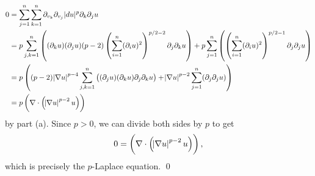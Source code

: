 \documentclass{article}
\newcommand{\D}{\nabla}
\renewcommand{\d}{\partial}
\begin{document}
\begin{enumerate}[(a)]
    \begin{align*}
        0 &= \sum_{j=1}^n\sum_{k=1}^n \d_{v_k}\d_{v_j}|du|^p \d_k\d_j u \\
        &= p \sum_{j,k =1}^n \del{ (\d_k u)(\d_j u)(p-2)\del{\sum_{i=1}^n (\d_i u)^2}^{p/2-2}\d_j\d_k u} + p\sum_{j=1}^n\del{\del{\sum_{i=1}^n (\d_iu)^2}^{p/2-1}\d_j\d_j u} \\
        &= p\del{(p-2)\abs{\D u}^{p-4}\sum_{j,k = 1}^n\del{(\d_j u)(\d_k u)\d_j\d_k u} + \abs{\D u}^{p-2}\sum_{j=1}^n(\d_j\d_j u)}\\
        &= p\del{\D \cdot \del{\abs{\D u}^{p-2}u}}
    \end{align*}
    by part (a). Since $p>0$, we can divide both sides by $p$ to get 
    \[0 = \del{\D \cdot \del{\abs{\D u}^{p-2}u}},\]
    which is precisely the $p$-Laplace equation. \qed
\end{enumerate}
\end{document}
